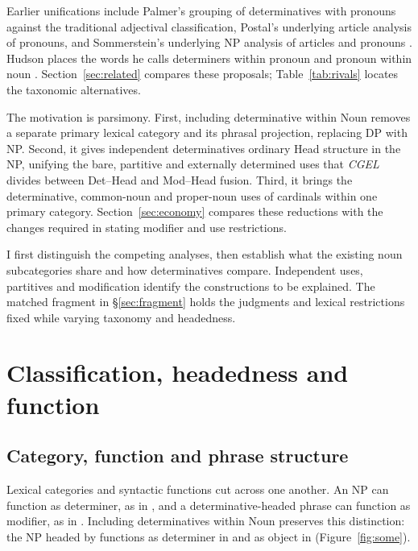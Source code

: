 \documentclass[12pt]{article}
\begin{document}
Earlier unifications include Palmer's grouping of determinatives with pronouns against the traditional adjectival classification, Postal's underlying article analysis of pronouns, and Sommerstein's underlying NP analysis of articles and pronouns \citep{palmer1924,postal1966,sommerstein1972}. Hudson places the words he calls determiners within pronoun and pronoun within noun \citep{hudson2004determiners,hudson2010wordgrammar}. Section~\ref{sec:related} compares these proposals; Table~\ref{tab:rivals} locates the taxonomic alternatives.

The motivation is parsimony. First, including determinative within Noun removes a separate primary lexical category and its phrasal projection, replacing DP with NP. Second, it gives independent determinatives ordinary Head structure in the NP, unifying the bare, partitive and externally determined uses that \textit{CGEL} divides between Det--Head and Mod--Head fusion. Third, it brings the determinative, common-noun and proper-noun uses of cardinals within one primary category. Section~\ref{sec:economy} compares these reductions with the changes required in stating modifier and use restrictions.

I first distinguish the competing analyses, then establish what the existing noun subcategories share and how determinatives compare. Independent uses, partitives and modification identify the constructions to be explained. The matched fragment in §\ref{sec:fragment} holds the judgments and lexical restrictions fixed while varying taxonomy and headedness.

\section{Classification, headedness and function}\label{sec:alternatives}

\subsection{Category, function and phrase structure}\label{sec:category-function}

Lexical categories and syntactic functions cut across one another. An NP can function as determiner, as in , and a determinative-headed phrase can function as modifier, as in  \citep{payne2010,pullummiller2022nps}. Including determinatives within Noun preserves this distinction: the NP headed by  functions as determiner in  and as object in  (Figure~\ref{fig:some}).
\end{document}
